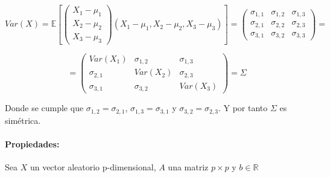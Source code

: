 \[
Var(X)=
\mathbb{E}\left[
\left(
\begin{array}{c}
X_1-\mu_1\\
X_2-\mu_2\\
X_3-\mu_3
\end{array}
\right)
(X_1-\mu_1, X_2-\mu_2, X_3-\mu_3)\right]=
\left(
\begin{array}{ccc}
\sigma_{1,1}& \sigma_{1,2}& \sigma_{1,3} \\
\sigma_{2,1}& \sigma_{2,2}& \sigma_{2,3} \\
\sigma_{3,1}& \sigma_{3,2}& \sigma_{3,3}
\end{array}
\right)=
\]

\[
=\left(
\begin{array}{ccc}
Var(X_1)& \sigma_{1,2}& \sigma_{1,3} \\
\sigma_{2,1}& Var(X_2)& \sigma_{2,3} \\
\sigma_{3,1}& \sigma_{3,2}& Var(X_3)
\end{array}
\right) = \Sigma
\]

Donde se cumple que $\sigma_{1,2}=\sigma_{2,1}$, $\sigma_{1,3}=\sigma_{3,1}$ y $\sigma_{3,2}=\sigma_{2,3}$. Y por tanto $\Sigma$ es simétrica.

\paragraph{Propiedades:}

Sea $X$ un vector aleatorio p-dimensional, $A$ una matriz $p\times p$ y $b∈ℝ$

